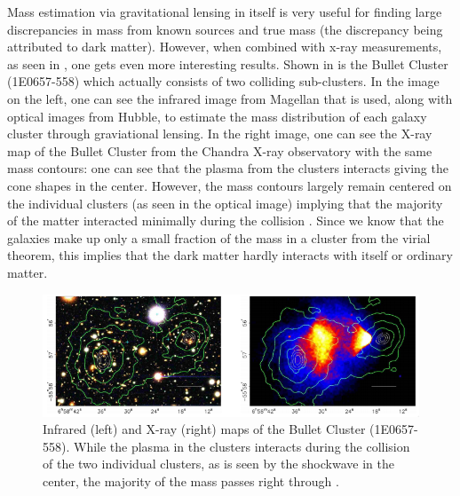 
Mass estimation via gravitational lensing in itself is very useful for finding large discrepancies in mass from known sources and true mass (the discrepancy being attributed to dark matter).  However, when combined with x-ray measurements, as seen in , one gets even more interesting results.  Shown in  is the Bullet Cluster (1E0657-558) which actually consists of two colliding sub-clusters.  In the image on the left, one can see the infrared image from Magellan that is used, along with optical images from Hubble, to estimate the mass distribution of each galaxy cluster through graviational lensing.  In the right image, one can see the X-ray map of the Bullet Cluster from the Chandra X-ray observatory with the same mass contours: one can see that the plasma from the clusters interacts giving the cone shapes in the center.  However, the mass contours largely remain centered on the individual clusters (as seen in the optical image) implying that the majority of the matter interacted minimally during the collision \cite{clowe2006direct}.  Since we know that the galaxies make up only a small fraction of the mass in a cluster from the virial theorem, this implies that the dark matter hardly interacts with itself or ordinary matter.


\begin{figure}[t]
	\centering
	\includegraphics[width=0.999\textwidth]{bullet_cluster}
	\caption{Infrared (left) and X-ray (right) maps of the Bullet Cluster (1E0657-558).  While the plasma in the clusters interacts during the collision of the two individual clusters, as is seen by the shockwave in the center, the majority of the mass passes right through \cite{clowe2006direct}.}
	\label{fig:bullet_cluster}
\end{figure}


